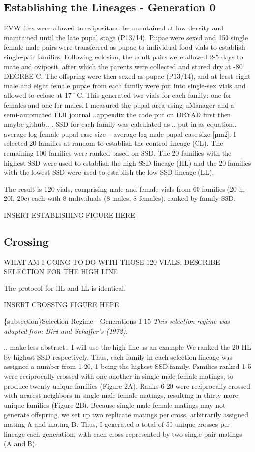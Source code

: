 \documentclass[
  11pt,
]{article}
\begin{document}
\subsection{Establishing the Lineages - Generation 0} 
FVW flies were allowed to ovipositand be maintained at low density and maintained until the late pupal stage (P13/14).
Pupae were sexed and 150 single female-male pairs were
transferred as pupae to individual food vials to establish single-pair families.
Following eclosion, the adult pairs were allowed 2-5 days to mate and
oviposit, after which the parents were collected and stored dry at -80 DEGREE C.
The offspring were then sexed as pupae (P13/14), and at least eight male and eight
female pupae from each family were put into single-sex vials and allowed to
eclose at 17˚C. This generated two vials for each family: one for
females and one for males. I measured
the pupal area using uManager and a semi-automated FIJI journal ..appendix the code put on DRYAD first then maybe github.. . SSD for each family was calculated as .. put in as equation.. average log female pupal case size -- average
log male pupal case size {[}µm2{]}. I selected 20 families at
random to establish the control lineage (CL). The remaining 100 families were
ranked based on SSD. The 20 families with the highest SSD were used
to establish the high SSD lineage (HL) and the 20 families with the
lowest SSD were used to establish the low SSD lineage (LL). 

The result is 120 vials, comprising male and female vials from 60 families (20 h, 20l, 20c) each with 8 individuals (8 males, 8 females), ranked by family SSD.


INSERT ESTABLISHING FIGURE HERE

\subsection{Crossing}
WHAT AM I GOING TO DO WITH THOSE 120 VIALS. DESCRIBE SELECTION FOR THE HIGH LINE

The protocol for HL and LL is identical.

INSERT CROSSING FIGURE HERE

\{subsection\}Selection Regime - Generations 1-15
\textit{This selection regime was adapted from
Bird and Schaffer's (1972).}

.. make less abstract.. I will use the high line as an example
We ranked the
20 HL by highest SSD respectively. Thus, each family
in each selection lineage was assigned a number from 1-20, 1 being the highest SSD family. Families ranked 1-5 were reciprocally crossed
with one another in single-male-female matings, to produce twenty unique
families (Figure 2A). Ranks 6-20 were reciprocally crossed with nearest
neighbors in single-male-female matings, resulting in thirty more unique
families (Figure 2B). Because single-male-female matings may not
generate offspring, we set up two replicate matings per cross, arbitrarily
assigned mating A and mating B. Thus, I
generated a total of 50 unique crosses per lineage each generation, with
each cross represented by two single-pair matings (A and B).
\end{document}
